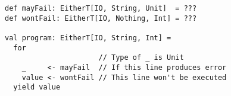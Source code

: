 \begin{algorithm}

\begin{verbatim}
def mayFail: EitherT[IO, String, Unit]  = ???
def wontFail: EitherT[IO, Nothing, Int] = ???

val program: EitherT[IO, String, Int] =
  for
                      // Type of _ is Unit
    _     <- mayFail  // If this line produces error
    value <- wontFail // This line won't be executed
  yield value
\end{verbatim}

\caption{Usage of EitherT monad transformer with IO monad.%
\label{monadtransformer:either-t-io}}
\end{algorithm}